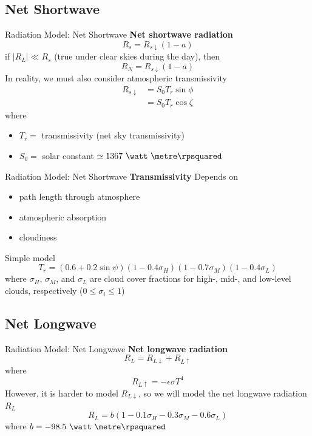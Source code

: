 \subsection{Net Shortwave}
\begin{frame}{Radiation Model: Net Shortwave}
\textbf{Net shortwave radiation}
$$R_s = R_{s\downarrow}(1-a)$$
if $|R_L|\ll R_s$ (true under clear skies during the day), then
$$R_N = R_{s\downarrow}(1-a)$$
In reality, we must also consider atmospheric transmissivity
\begin{align*}
	R_{s\downarrow} &= S_0 T_r \sin \phi\\
	&= S_0 T_r \cos \zeta
\end{align*}
where
\begin{itemize}
	\item $T_r =$ transmissivity (net sky transmissivity)
	\item $S_0 =$ solar constant $\simeq 1367\ \watt\ \metre\rpsquared$
\end{itemize}
\end{frame}
\begin{frame}{Radiation Model: Net Shortwave}
\textbf{Transmissivity}
Depends on 
\begin{itemize}
	\item path length through atmosphere
	\item atmospheric absorption
	\item cloudiness
\end{itemize}
Simple model
$$T_r = (0.6 + 0.2\sin \psi)(1-0.4\sigma_H)(1-0.7\sigma_M)(1-0.4\sigma_L)$$
where $\sigma_H$, $\sigma_M$, and $\sigma_L$ are cloud cover fractions for high-, mid-, and low-level clouds, respectively ($0 \leq \sigma_i \leq 1$)
\end{frame}
\subsection{Net Longwave}
\begin{frame}{Radiation Model: Net Longwave}
\textbf{Net longwave radiation}
$$R_L = R_{L\downarrow} + R_{L\uparrow}$$
where
$$R_{L\uparrow} = -\epsilon \sigma T^4$$
However, it is harder to model $R_{L\downarrow}$, so we will model the net longwave radiation $R_L$
$$R_L = b(1-0.1\sigma_H - 0.3\sigma_M-0.6\sigma_L)$$
where $b = -98.5\ \watt\ \metre\rpsquared$ 
\end{frame}
